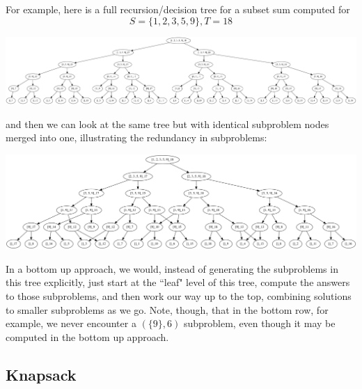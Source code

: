 \documentclass[10pt,a4paper]{article}
\begin{document}
For example, here is a full recursion/decision tree for a subset sum computed for $$S=\{1,2,3,5,9\},T=18$$
\begin{center}
    \includegraphics[scale=0.1]{diagrams/subset_sum_tree.png}
\end{center}
and then we can look at the same tree but with identical subproblem nodes merged into one, illustrating the redundancy in subproblems:
\begin{center}
    \includegraphics[scale=0.15]{diagrams/subset_sum_tree_opt.png}
\end{center}
In a bottom up approach, we would, instead of generating the subproblems in this tree explicitly, just start at the ``leaf" level of this tree, compute the answers to those subproblems, and then work our way up to the top, combining solutions to smaller subproblems as we go. Note, though, that in the bottom row, for example, we never encounter a $(\{9\},6)$ subproblem, even though it may be computed in the bottom up approach.





\subsection*{Knapsack}
\end{document}
